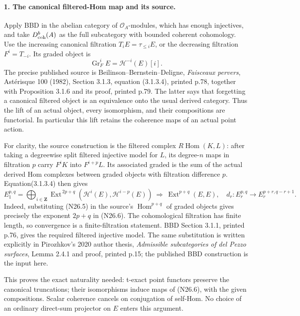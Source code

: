 \paragraph{1. The canonical filtered-Hom map and its source.}
Apply BBD in the abelian category of $\mathcal O_A$-modules,
which has enough injectives, and take $D^b_{\rm coh}(A)$
as the full subcategory with bounded coherent cohomology.
Use the increasing canonical filtration
$T_iE=\tau_{\le i}E$, or the decreasing filtration
$F^i=T_{-i}$. Its graded object is
\[
                  \operatorname{Gr}_F^iE
                            =\mathcal H^{-i}(E)[i].      \tag{N26.5}
\]
The precise published source is Beilinson--Bernstein--Deligne,
\emph{Faisceaux pervers}, Ast\'erisque 100 (1982),
Section 3.1.3, equation (3.1.3.4), printed p.78, together with
Proposition 3.1.6 and its proof, printed p.79. The latter says
that forgetting a canonical filtered object is an equivalence
onto the usual derived category. Thus the lift of an actual
object, every isomorphism, and their compositions are
functorial. In particular this lift retains the coherence
maps of an actual point action.

For clarity, the source construction is the filtered complex
$R\operatorname{Hom}(K,L)$: after taking a degreewise split
filtered injective model for $L$, its degree-$n$ maps in
filtration $p$ carry $F^iK$ into $F^{i+p}L$.
Its associated graded is the sum of the actual derived Hom
complexes between graded objects with filtration difference
$p$. Equation(3.1.3.4) then gives
\[
 E_1^{p,q}=
  \bigoplus_{i\in\mathbf Z}
  \operatorname{Ext}^{\,2p+q}
       (\mathcal H^i(E),\mathcal H^{i-p}(E))
  \ \Longrightarrow\ \operatorname{Ext}^{p+q}(E,E),
 \quad d_r:E_r^{p,q}\longrightarrow E_r^{p+r,q-r+1}.
                                                               \tag{N26.6}
\]
Indeed, substituting (N26.5) in the source's
$\operatorname{Hom}^{p+q}$ of graded objects gives precisely
the exponent $2p+q$ in (N26.6). The cohomological filtration
has finite length, so convergence is a finite-filtration
statement. BBD Section 3.1.1, printed p.76, gives the required
filtered injective model. The same substitution is written
explicitly in Pirozhkov's 2020 author thesis,
\emph{Admissible subcategories of del Pezzo surfaces},
Lemma 2.4.1 and proof, printed p.15; the published BBD
construction is the input here.

This proves the exact naturality needed: t-exact point
functors preserve the canonical truncations; their
isomorphisms induce maps of (N26.6), with the given
compositions. Scalar coherence cancels on conjugation of
self-Hom. No choice of an ordinary direct-sum projector on
$E$ enters this argument.

